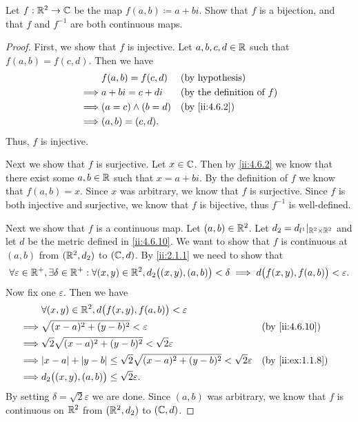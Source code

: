 \begin{ex}\label{ii:ex:4.6.11}
  Let \(f : \mathbb{R}^2 \to \mathbb{C}\) be the map \(f(a, b) \coloneqq a + bi\).
  Show that \(f\) is a bijection, and that \(f\) and \(f^{-1}\) are both continuous maps.
\end{ex}

\begin{proof}
  First, we show that \(f\) is injective.
  Let \(a, b, c, d \in \mathbb{R}\) such that \(f(a, b) = f(c, d)\).
  Then we have
  \begin{align*}
             & f(a, b) = f(c, d)     &  & \text{(by hypothesis)}              \\
    \implies & a + bi = c + di       &  & \text{(by the definition of \(f\))} \\
    \implies & (a = c) \land (b = d) &  & \by{ii:4.6.2}                       \\
    \implies & (a, b) = (c, d).
  \end{align*}
  Thus, \(f\) is injective.

  Next we show that \(f\) is surjective.
  Let \(x \in \mathbb{C}\).
  Then by \cref{ii:4.6.2} we know that there exist some \(a, b \in \mathbb{R}\) such that \(x = a + bi\).
  By the definition of \(f\) we know that \(f(a, b) = x\).
  Since \(x\) was arbitrary, we know that \(f\) is surjective.
  Since \(f\) is both injective and surjective, we know that \(f\) is bijective, thus \(f^{-1}\) is well-defined.

  Next we show that \(f\) is a continuous map.
  Let \((a, b) \in \mathbb{R}^2\).
  Let \(d_2 = d_{l^1}|_{\mathbb{R}^2 \times \mathbb{R}^2}\) and let \(d\) be the metric defined in \cref{ii:4.6.10}.
  We want to show that \(f\) is continuous at \((a, b)\) from \((\mathbb{R}^2, d_2)\) to \((\mathbb{C}, d)\).
  By \cref{ii:2.1.1} we need to show that
  \[
    \forall \varepsilon \in \mathbb{R}^+, \exists \delta \in \mathbb{R}^+ : \forall (x, y) \in \mathbb{R}^2, d_2\big((x, y), (a, b)\big) < \delta \implies d\big(f(x, y), f(a, b)\big) < \varepsilon.
  \]
  Now fix one \(\varepsilon\).
  Then we have
  \begin{align*}
             & \forall (x, y) \in \R^2, d\big(f(x, y), f(a, b)\big) < \varepsilon                                                \\
    \implies & \sqrt{(x - a)^2 + (y - b)^2} < \varepsilon                                                  &  & \by{ii:4.6.10}   \\
    \implies & \sqrt{2} \sqrt{(x - a)^2 + (y - b)^2} < \sqrt{2} \varepsilon                                                      \\
    \implies & \abs{x - a} + \abs{y - b} \leq \sqrt{2} \sqrt{(x - a)^2 + (y - b)^2} < \sqrt{2} \varepsilon &  & \by{ii:ex:1.1.8} \\
    \implies & d_2\big((x, y), (a, b)\big) \leq \sqrt{2} \varepsilon.
  \end{align*}
  By setting \(\delta = \sqrt{2} \varepsilon\) we are done.
  Since \((a, b)\) was arbitrary, we know that \(f\) is continuous on \(\mathbb{R}^2\) from \((\mathbb{R}^2, d_2)\) to \((\mathbb{C}, d)\).


\end{proof}
